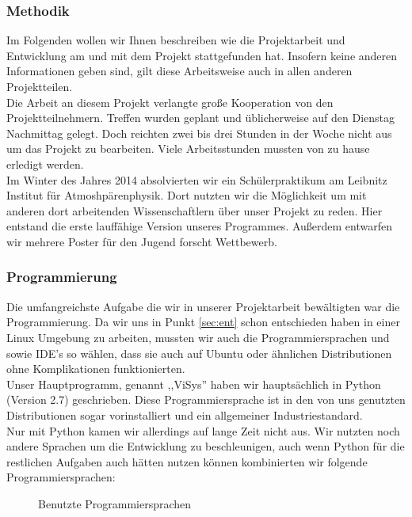 \documentclass[a4paper,oneside,12pt,titlepage]{article}
\newcommand{\jf}{Jugend forscht }
\newcommand{\vsr}{ViSys}
\begin{document}
\subsubsection{Methodik} %
Im Folgenden wollen wir Ihnen beschreiben wie die Projektarbeit und Entwicklung am  und mit dem Projekt stattgefunden hat.
Insofern keine anderen Informationen geben sind, gilt diese Arbeitsweise auch in allen anderen Projektteilen. \\
Die Arbeit an diesem Projekt verlangte große Kooperation von den Projektteilnehmern. Treffen wurden geplant und üblicherweise auf den Dienstag Nachmittag gelegt. Doch reichten zwei bis drei Stunden in der Woche nicht aus um das Projekt zu bearbeiten. Viele Arbeitsstunden mussten von zu hause erledigt werden.\\
Im Winter des Jahres 2014 absolvierten wir ein Schülerpraktikum am Leibnitz Institut für Atmoshpärenphysik. %
Dort nutzten wir die Möglichkeit um mit anderen dort arbeitenden Wissenschaftlern über unser Projekt zu reden. Hier entstand die erste lauffähige Version unseres Programmes. Außerdem entwarfen wir mehrere Poster für den \jf Wettbewerb.

\subsubsection{Programmierung}
Die umfangreichste Aufgabe die wir in unserer Projektarbeit bewältigten war die Programmierung. Da wir uns in Punkt \ref{sec:ent}  schon entschieden haben in einer Linux Umgebung zu arbeiten, mussten wir auch die Programmiersprachen und sowie IDE's so wählen, dass sie auch auf Ubuntu oder ähnlichen Distributionen ohne Komplikationen funktionierten.\\
Unser Hauptprogramm, genannt ,,\vsr '' haben wir hauptsächlich in Python (Version 2.7) \cite{python27} geschrieben. Diese Programmiersprache ist in den von uns genutzten Distributionen sogar vorinstalliert und ein allgemeiner Industriestandard.\\
Nur mit Python kamen wir allerdings auf lange Zeit nicht aus. Wir nutzten noch andere Sprachen um die Entwicklung zu beschleunigen, auch wenn Python für die restlichen Aufgaben auch hätten nutzen können kombinierten wir folgende Programmiersprachen:
\begin{figure}[H]

\label{fig:pyvi}
\caption{Benutzte Programmiersprachen}
\end{figure}
\end{document}
